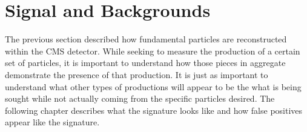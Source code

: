 \chapter{Signal and Backgrounds}
The previous section described how fundamental particles are reconstructed within the CMS detector. While seeking to measure the production of a certain set of particles, it is important to understand how those pieces in aggregate demonstrate the presence of that production. It is just as important to understand what other types of productions will appear to be the what is being sought while not actually coming from the specific particles desired. The following chapter describes what the \ttZ signature looks like and how false positives appear like the \ttZ signature.\\

	
	
